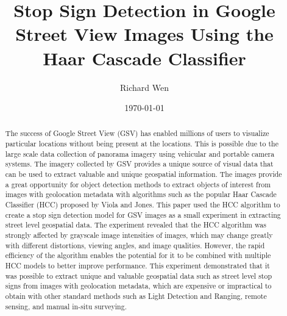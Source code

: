 \documentclass{article}
\begin{document}

\title{Stop Sign Detection in Google Street View Images Using the Haar Cascade Classifier}
\author{Richard Wen}
\date{\footnotesize \today}

\maketitle


\begin{abstract}
The success of Google Street View (GSV) has enabled millions of users to visualize particular locations without being present at the locations. This is possible due to the large scale data collection of panorama imagery using vehicular and portable camera systems. The imagery collected by GSV provides a unique source of visual data that can be used to extract valuable and unique geospatial information. The images provide a great opportunity for object detection methods to extract objects of interest from images with geolocation metadata with algorithms such as the popular Haar Cascade Classifier (HCC) proposed by Viola and Jones. This paper used the HCC algorithm to create a stop sign detection model for GSV images as a small experiment in extracting street level geospatial data. The experiment revealed that the HCC algorithm was strongly affected by grayscale image intensities of images, which may change greatly with different distortions, viewing angles, and image qualities. However, the rapid efficiency of the algorithm enables the potential for it to be combined with multiple HCC models to better improve performance. This experiment demonstrated that it was possible to extract unique and valuable geospatial data such as street level stop signs from images with geolocation metadata, which are expensive or impractical to obtain with other standard methods such as Light Detection and Ranging, remote sensing, and manual in-situ surveying.
\end{abstract}



\end{document}

